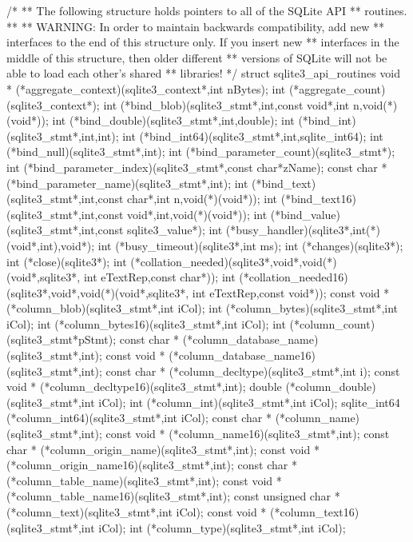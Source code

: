 \begin{Codex}[label=sqlite3ext.h,numbers=left]
/*
** The following structure holds pointers to all of the SQLite API
** routines.
**
** WARNING:  In order to maintain backwards compatibility, add new
** interfaces to the end of this structure only.  If you insert new
** interfaces in the middle of this structure, then older different
** versions of SQLite will not be able to load each other's shared
** libraries!
*/
struct sqlite3_api_routines {
  void * (*aggregate_context)(sqlite3_context*,int nBytes);
  int  (*aggregate_count)(sqlite3_context*);
  int  (*bind_blob)(sqlite3_stmt*,int,const void*,int n,void(*)(void*));
  int  (*bind_double)(sqlite3_stmt*,int,double);
  int  (*bind_int)(sqlite3_stmt*,int,int);
  int  (*bind_int64)(sqlite3_stmt*,int,sqlite_int64);
  int  (*bind_null)(sqlite3_stmt*,int);
  int  (*bind_parameter_count)(sqlite3_stmt*);
  int  (*bind_parameter_index)(sqlite3_stmt*,const char*zName);
  const char * (*bind_parameter_name)(sqlite3_stmt*,int);
  int  (*bind_text)(sqlite3_stmt*,int,const char*,int n,void(*)(void*));
  int  (*bind_text16)(sqlite3_stmt*,int,const void*,int,void(*)(void*));
  int  (*bind_value)(sqlite3_stmt*,int,const sqlite3_value*);
  int  (*busy_handler)(sqlite3*,int(*)(void*,int),void*);
  int  (*busy_timeout)(sqlite3*,int ms);
  int  (*changes)(sqlite3*);
  int  (*close)(sqlite3*);
  int  (*collation_needed)(sqlite3*,void*,void(*)(void*,sqlite3*,
                           int eTextRep,const char*));
  int  (*collation_needed16)(sqlite3*,void*,void(*)(void*,sqlite3*,
                             int eTextRep,const void*));
  const void * (*column_blob)(sqlite3_stmt*,int iCol);
  int  (*column_bytes)(sqlite3_stmt*,int iCol);
  int  (*column_bytes16)(sqlite3_stmt*,int iCol);
  int  (*column_count)(sqlite3_stmt*pStmt);
  const char * (*column_database_name)(sqlite3_stmt*,int);
  const void * (*column_database_name16)(sqlite3_stmt*,int);
  const char * (*column_decltype)(sqlite3_stmt*,int i);
  const void * (*column_decltype16)(sqlite3_stmt*,int);
  double  (*column_double)(sqlite3_stmt*,int iCol);
  int  (*column_int)(sqlite3_stmt*,int iCol);
  sqlite_int64  (*column_int64)(sqlite3_stmt*,int iCol);
  const char * (*column_name)(sqlite3_stmt*,int);
  const void * (*column_name16)(sqlite3_stmt*,int);
  const char * (*column_origin_name)(sqlite3_stmt*,int);
  const void * (*column_origin_name16)(sqlite3_stmt*,int);
  const char * (*column_table_name)(sqlite3_stmt*,int);
  const void * (*column_table_name16)(sqlite3_stmt*,int);
  const unsigned char * (*column_text)(sqlite3_stmt*,int iCol);
  const void * (*column_text16)(sqlite3_stmt*,int iCol);
  int  (*column_type)(sqlite3_stmt*,int iCol);
}
\end{Codex}
